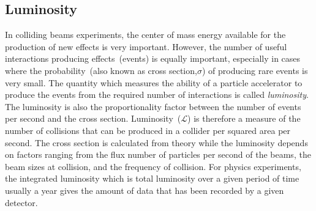 \subsection{Luminosity}
In colliding beams experiments, the center of mass energy available for the production of new effects is very important.
However, the number of useful interactions producing effects~(events) is equally important, especially
in cases where the probability~(also known as cross section,$\sigma$) of producing rare events is very small.
The quantity which measures the ability of a particle accelerator to produce the events from the required number of 
interactions is called \textit{luminosity}. The luminosity is also the proportionality factor between
the number of events per second and the cross section. Luminosity~($\mathscr{L}$) is therefore a measure of the number of collisions that can be produced in a collider per squared area per second. 
The cross section is calculated from theory while the luminosity depends on factors ranging from
the flux \ie number of particles per second  of the beams, the beam sizes at collision, and the frequency of collision.
For physics experiments, the integrated luminosity which is total luminosity over a given period of time
usually a year gives the amount of data that has been recorded by a given detector. 

